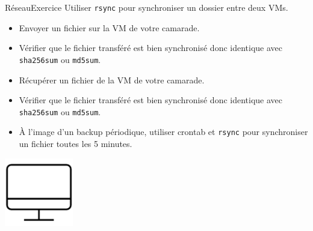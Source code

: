 \documentclass{beamer}
\begin{document}
    \begin{frame}{Réseau}{Exercice \execcounterdispinc}
        Utiliser \lstinline{rsync} pour synchroniser un dossier entre deux VMs.
        \begin{itemize}
            \item Envoyer un fichier sur la VM de votre camarade.
            \item Vérifier que le fichier transféré est bien synchronisé donc identique avec \lstinline{sha256sum} ou \lstinline{md5sum}.
            \item Récupérer un fichier de la VM de votre camarade.
            \item Vérifier que le fichier transféré est bien synchronisé donc identique avec \lstinline{sha256sum} ou \lstinline{md5sum}.
            \item À l'image d'un backup périodique, utiliser crontab et \lstinline{rsync} pour synchroniser un fichier toutes les 5 minutes.
        \end{itemize}
        \begin{center}
            \includegraphics[width=3cm]{image/desktop}
        \end{center}
    \end{frame}
\end{document}
